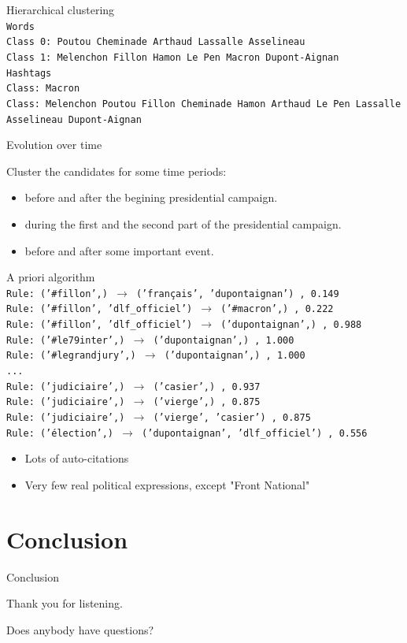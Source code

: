 \documentclass{beamer}
\begin{document}
\begin{frame}{Hierarchical clustering}
\texttt{\\
Words\\
Class 0: Poutou Cheminade Arthaud Lassalle Asselineau\\
Class 1: Melenchon Fillon Hamon Le Pen Macron Dupont-Aignan\\
\bigskip
Hashtags\\
Class: Macron\\
Class: Melenchon Poutou Fillon Cheminade Hamon Arthaud Le Pen Lassalle Asselineau Dupont-Aignan\\
}
\end{frame}

\begin{frame}{Evolution over time}
\begin{block}{}
Cluster the candidates for some time periods:
\begin{itemize}
\item before and after the begining presidential campaign.
\item during the first and the second part of the presidential campaign.
\item before and after some important event.
\end{itemize}
\end{block}
\end{frame}

\begin{frame}{A priori algorithm}
\begingroup
\fontsize{9pt}{12pt}
\texttt{\\
Rule: ('\#fillon',) $\to$ ('français', 'dupontaignan') , 0.149\\
Rule: ('\#fillon', 'dlf\_officiel') $\to$ ('\#macron',) , 0.222\\
Rule: ('\#fillon', 'dlf\_officiel') $\to$ ('dupontaignan',) , 0.988\\
Rule: ('\#le79inter',) $\to$ ('dupontaignan',) , 1.000\\
Rule: ('\#legrandjury',) $\to$ ('dupontaignan',) , 1.000\\
...\\
Rule: ('judiciaire',) $\to$ ('casier',) , 0.937\\
Rule: ('judiciaire',) $\to$ ('vierge',) , 0.875\\
Rule: ('judiciaire',) $\to$ ('vierge', 'casier') , 0.875\\
Rule: ('élection',) $\to$ ('dupontaignan', 'dlf\_officiel') , 0.556\\
}
\endgroup


\begin{itemize}
\item Lots of auto-citations
\item Very few real political expressions, except "Front National"
\end{itemize}
\end{frame}


\section{Conclusion}
\begin{frame}{Conclusion}
\begin{center}
Thank you for listening. 
\bigskip


Does anybody have questions?
\end{center}
\end{frame}
 
\end{document}
